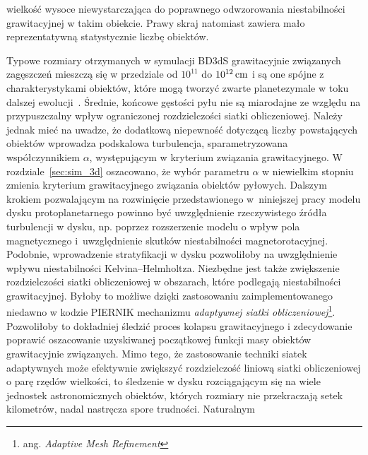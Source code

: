 wielkość wysoce niewystarczająca do poprawnego odwzorowania niestabilności
grawitacyjnej w takim obiekcie.  Prawy skraj natomiast zawiera mało
reprezentatywną statystycznie liczbę obiektów.
%
\par Typowe rozmiary otrzymanych w symulacji BD3dS grawitacyjnie związanych
zagęszczeń mieszczą się w przedziale od $10^{11}$ do $10^{12}\hbox{$\thinspace\textrm{cm}$}$ i są one spójne z
charakterystykami obiektów, które mogą tworzyć zwarte planetezymale w toku
dalszej ewolucji~\cite{HS08}. Średnie, końcowe gęstości pyłu nie są miarodajne
ze względu na przypuszczalny wpływ ograniczonej rozdzielczości siatki
obliczeniowej. Należy jednak mieć na uwadze, że dodatkową niepewność dotyczącą
liczby powstających obiektów wprowadza podskalowa turbulencja, sparametryzowana
współczynnikiem $\alpha$, występującym w kryterium związania
grawitacyjnego.
W rozdziale~\ref{sec:sim_3d} oszacowano, że wybór parametru $\alpha$ w
niewielkim stopniu zmienia kryterium grawitacyjnego związania obiektów pyłowych.
Dalszym krokiem pozwalającym na rozwinięcie przedstawionego w~niniejszej pracy
modelu dysku protoplanetarnego powinno być uwzględnienie rzeczywistego źródła
turbulencji w dysku, np. poprzez rozszerzenie modelu o wpływ pola magnetycznego
i~uwzględnienie skutków niestabilności magnetorotacyjnej. Podobnie, wprowadzenie
stratyfikacji w dysku pozwoliłoby na uwzględnienie wpływu niestabilności
Kelvina--Helmholtza.  Niezbędne jest także zwiększenie rozdzielczości siatki
obliczeniowej w obszarach, które podlegają niestabilności grawitacyjnej. Byłoby
to możliwe dzięki zastosowaniu zaimplementowanego niedawno w kodzie
\textsc{PIERNIK} mechanizmu \emph{adaptywnej siatki obliczeniowej}\footnote{ang.
\emph{Adaptive Mesh Refinement}}. Pozwoliłoby to dokładniej śledzić proces
kolapsu grawitacyjnego i zdecydowanie poprawić oszacowanie uzyskiwanej
początkowej funkcji masy obiektów grawitacyjnie związanych.  Mimo tego, że
zastosowanie techniki siatek adaptywnych może efektywnie zwiększyć rozdzielczość
liniową siatki obliczeniowej o parę rzędów wielkości, to śledzenie w dysku
rozciągającym się na wiele jednostek astronomicznych obiektów, których rozmiary
nie przekraczają setek kilometrów, nadal nastręcza spore trudności.  Naturalnym

